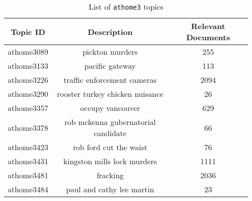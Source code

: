 \begin{table}[h]
\centering
\caption{List of \texttt{athome3} topics}
\label{tab:topics_athome3}
\begin{tabular}{|c|c|c|}
\hline
\textbf{Topic ID} & \textbf{Description} & \textbf{Relevant Documents} \\ \hline \hline
athome3089 & pickton murders                     & 255 \\ \hline
athome3133 & pacific gateway                     & 113 \\ \hline
athome3226 & traffic enforcement cameras         & 2094 \\ \hline
athome3290 & rooster turkey chicken nuisance     & 26 \\ \hline
athome3357 & occupy vancouver                    & 629 \\ \hline
athome3378 & rob mckenna gubernatorial candidate & 66 \\ \hline
athome3423 & rob ford cut the waist              & 76 \\ \hline
athome3431 & kingston mills lock murders         & 1111 \\ \hline
athome3481 & fracking                            & 2036 \\ \hline
athome3484 & paul and cathy lee martin           & 23 \\ \hline
\end{tabular}
\end{table}

